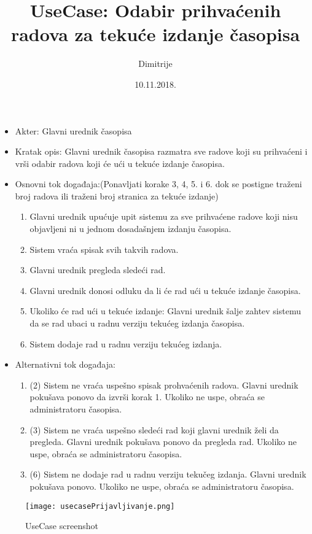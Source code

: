 \documentclass[a4paper]{article}
\title{UseCase: Odabir prihvaćenih radova za tekuće izdanje časopisa}
\date{10.11.2018.}
\author{Dimitrije}
\begin{document}
\maketitle

\begin{itemize}
    \item Akter: Glavni urednik časopisa
    \item Kratak opis: Glavni urednik časopisa razmatra sve radove koji su prihvaćeni i vrši odabir radova koji će ući u tekuće izdanje časopisa.
    \item Osnovni tok događaja:(Ponavljati korake 3, 4, 5. i 6. dok se postigne traženi broj radova ili traženi broj stranica za tekuće izdanje)
        \begin{enumerate}
            \item Glavni urednik upućuje upit sistemu za sve prihvaćene radove koji nisu objavljeni ni u jednom dosadašnjem izdanju časopisa.
            \item Sistem vraća spisak svih takvih radova.
            \item Glavni urednik pregleda sledeći rad.
            \item Glavni urednik donosi odluku da li će rad ući u tekuće izdanje časopisa.
            \item Ukoliko će rad ući u tekuće izdanje: Glavni urednik šalje zahtev sistemu da se rad ubaci u radnu verziju tekućeg izdanja časopisa.
            \item Sistem dodaje rad u radnu verziju tekućeg izdanja.
        \end{enumerate}
    \item Alternativni tok događaja:
        \begin{enumerate}
            \item  (2) Sistem ne vraća uspešno spisak prohvaćenih radova. Glavni urednik pokušava ponovo da izvrši korak 1. Ukoliko ne uspe, obraća se administratoru časopisa.
            \item (3) Sistem ne vraća uspešno sledeći rad koji glavni urednik želi da pregleda. Glavni urednik pokušava ponovo da pregleda rad. Ukoliko ne uspe, obraća se administratoru časopisa.
            \item (6) Sistem ne dodaje rad u radnu verziju tekučeg izdanja. Glavni urednik pokušava ponovo. Ukoliko ne uspe, obraća se administratoru časopisa.
        \end{enumerate}
\end{itemize}

\begin{figure}
    \centering
    \texttt{[image: usecasePrijavljivanje.png]}
    \caption{UseCase screenshot}
    \label{fig:my_label}
\end{figure}
\end{document}
